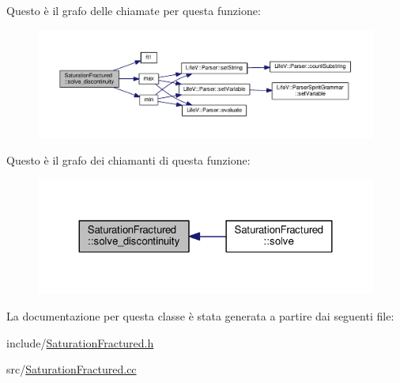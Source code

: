 Questo è il grafo delle chiamate per questa funzione\-:
\nopagebreak
\begin{figure}[H]
\begin{center}
\leavevmode
\includegraphics[width=350pt]{classSaturationFractured_ad1eb498b01ebc0826fd4bfe9da6b6a59_cgraph}
\end{center}
\end{figure}




Questo è il grafo dei chiamanti di questa funzione\-:
\nopagebreak
\begin{figure}[H]
\begin{center}
\leavevmode
\includegraphics[width=324pt]{classSaturationFractured_ad1eb498b01ebc0826fd4bfe9da6b6a59_icgraph}
\end{center}
\end{figure}




La documentazione per questa classe è stata generata a partire dai seguenti file\-:\begin{DoxyCompactItemize}
\item 
include/\hyperlink{SaturationFractured_8h}{Saturation\-Fractured.\-h}\item 
src/\hyperlink{SaturationFractured_8cc}{Saturation\-Fractured.\-cc}\end{DoxyCompactItemize}
